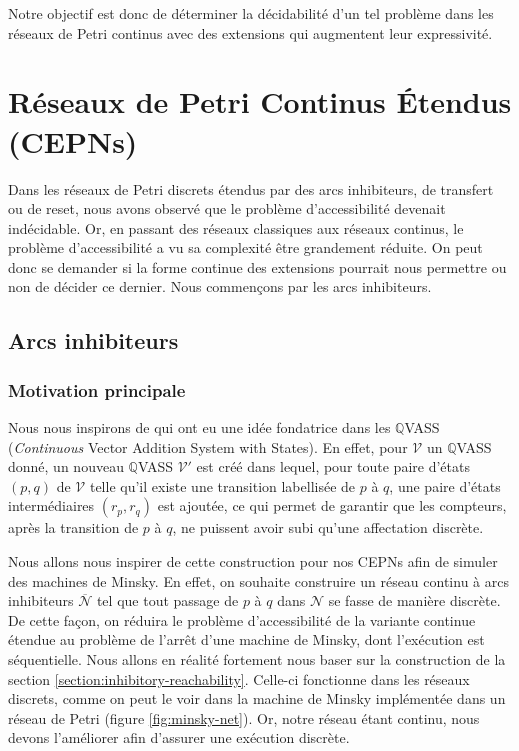 \documentclass{article}
\theoremstyle{remark}
\theoremstyle{remark}
\begin{document}
Notre objectif est donc de déterminer la décidabilité d'un tel problème dans les réseaux de Petri continus avec des extensions qui augmentent leur expressivité.

\newpage

\section{Réseaux de Petri Continus Étendus (CEPNs)}

Dans les réseaux de Petri discrets étendus par des arcs inhibiteurs, de transfert ou de reset, nous avons observé que le problème d'accessibilité devenait indécidable. Or, en passant des réseaux classiques aux réseaux continus, le problème d'accessibilité a vu sa complexité être grandement réduite. On peut donc se demander si la forme continue des extensions pourrait nous permettre ou non de décider ce dernier. Nous commençons par les arcs inhibiteurs.

\subsection{Arcs inhibiteurs}

\subsubsection{Motivation principale}

Nous nous inspirons de \cite{almagor_et_al} qui ont eu une idée fondatrice dans les $\mathbb{Q}$VASS (\textit{Continuous} Vector Addition System with States). En effet, pour $\mathcal{V}$ un $\mathbb{Q}$VASS donné, un nouveau $\mathbb{Q}$VASS $\mathcal{V}'$ est créé dans lequel, pour toute paire d'états $(p, q)$ de $\mathcal{V}$ telle qu'il existe une transition labellisée de $p$ à $q$, une paire d'états intermédiaires $(r_p, r_q)$ est ajoutée, ce qui permet de garantir que les compteurs, après la transition de $p$ à $q$, ne puissent avoir subi qu'une affectation discrète.

Nous allons nous inspirer de cette construction pour nos CEPNs afin de simuler des machines de Minsky. En effet, on souhaite construire un réseau continu à arcs inhibiteurs $\overline{\mathcal{N}}$ tel que tout passage de $p$ à $q$ dans $\mathcal{N}$ se fasse de manière discrète. De cette façon, on réduira le problème d'accessibilité de la variante continue étendue au problème de l'arrêt d'une machine de Minsky, dont l'exécution est séquentielle. Nous allons en réalité fortement nous baser sur la construction de la section \ref{section:inhibitory-reachability}. Celle-ci fonctionne dans les réseaux discrets, comme on peut le voir dans la machine de Minsky implémentée dans un réseau de Petri (figure \ref{fig:minsky-net}). Or, notre réseau étant continu, nous devons l'améliorer afin d'assurer une exécution discrète.
\end{document}
